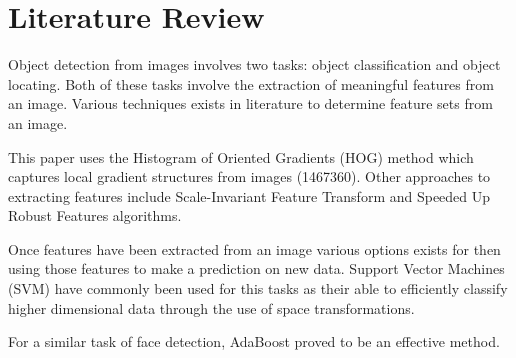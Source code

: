 \section{Literature Review}

Object detection from images involves two tasks: object classification and object locating. 
Both of these tasks involve the extraction of meaningful features from an image. 
Various techniques exists in literature to determine feature sets from an image.


This paper uses the Histogram of Oriented Gradients (HOG) method which captures local gradient structures from images (1467360).
Other approaches to extracting features include Scale-Invariant Feature Transform and Speeded Up Robust Features algorithms.


Once features have been extracted from an image various options exists for then using those features to make a prediction on new data. 
Support Vector Machines (SVM) have commonly been used for this tasks as their able to efficiently classify higher dimensional data through the use of space transformations. 

For a similar task of face detection, AdaBoost proved to be an effective method.